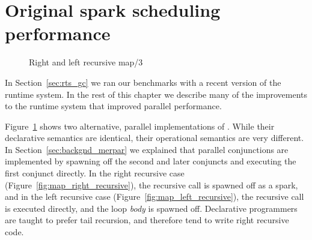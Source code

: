 
\section{Original spark scheduling performance}
\label{sec:rts_original_scheduling_performance}

\begin{figure}
\begin{center}
%
\end{center}
\caption{Right and left recursive map/3}
\label{fig:map_right_and_left_recursive}
\end{figure}

In Section~\ref{sec:rts_gc} we ran our benchmarks with a recent version of the
runtime system.
In the rest of this chapter we describe many of the improvements to the
runtime system that improved parallel performance.

Figure~\ref{fig:map_right_and_left_recursive} shows two alternative, parallel
implementations of .
While their declarative semantics are identical,
their operational semantics are very different.
In Section~\ref{sec:backgnd_merpar} we explained that parallel conjunctions
are implemented by spawning off the second and later conjuncts and executing
the first conjunct directly.
In the right recursive case (Figure~\ref{fig:map_right_recursive}),
the recursive call is spawned off as a spark,
and in the left recursive case (Figure~\ref{fig:map_left_recursive}),
the recursive call is executed directly, and the loop \emph{body} is
spawned off.
Declarative programmers are taught to prefer tail recursion,
and therefore tend to write right recursive code.

